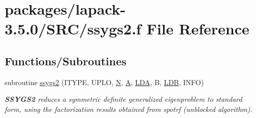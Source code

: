 \hypertarget{ssygs2_8f}{}\section{packages/lapack-\/3.5.0/\+S\+R\+C/ssygs2.f File Reference}
\label{ssygs2_8f}
\subsection*{Functions/\+Subroutines}
\begin{DoxyCompactItemize}
\item 
subroutine \hyperlink{group__realSYcomputational_ga0ea1b814a88acd6907337680dc1fde81}{ssygs2} (I\+T\+Y\+P\+E, U\+P\+L\+O, \hyperlink{polmisc_8c_a0240ac851181b84ac374872dc5434ee4}{N}, \hyperlink{classA}{A}, \hyperlink{example__user_8c_ae946da542ce0db94dced19b2ecefd1aa}{L\+D\+A}, B, \hyperlink{example__user_8c_a50e90a7104df172b5a89a06c47fcca04}{L\+D\+B}, I\+N\+F\+O)
\begin{DoxyCompactList}\small\item\em {\bfseries S\+S\+Y\+G\+S2} reduces a symmetric definite generalized eigenproblem to standard form, using the factorization results obtained from spotrf (unblocked algorithm). \end{DoxyCompactList}\end{DoxyCompactItemize}
